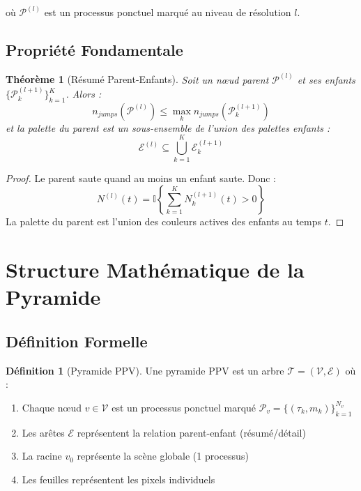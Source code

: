 \documentclass[12pt,a4paper]{article}
\newtheorem{theorem}{Théorème}[section]
\theoremstyle{definition}
\newtheorem{definition}{Définition}[section]
\begin{document}
	où $\mathcal{P}^{(l)}$ est un processus ponctuel marqué au niveau de résolution $l$.
	
	\subsection{Propriété Fondamentale}
	
	\begin{theorem}[Résumé Parent-Enfants]
		\label{thm:resume_parent}
		Soit un nœud parent $\mathcal{P}^{(l)}$ et ses enfants $\{\mathcal{P}^{(l+1)}_k\}_{k=1}^K$. Alors :
		\begin{equation}
			n_{jumps}(\mathcal{P}^{(l)}) \leq \max_k n_{jumps}(\mathcal{P}^{(l+1)}_k)
		\end{equation}
		et la palette du parent est un sous-ensemble de l'union des palettes enfants :
		\begin{equation}
			\mathcal{E}^{(l)} \subseteq \bigcup_{k=1}^K \mathcal{E}^{(l+1)}_k
		\end{equation}
	\end{theorem}
	
	\begin{proof}
		Le parent saute quand au moins un enfant saute. Donc :
		\begin{equation}
			N^{(l)}(t) = \mathbb{I}\left\{\sum_{k=1}^K N^{(l+1)}_k(t) > 0\right\}
		\end{equation}
		La palette du parent est l'union des couleurs actives des enfants au temps $t$.
	\end{proof}
	
	\section{Structure Mathématique de la Pyramide}
	
	\subsection{Définition Formelle}
	
	\begin{definition}[Pyramide PPV]
		\label{def:pyramide_ppv}
		Une pyramide PPV est un arbre $\mathcal{T} = (\mathcal{V}, \mathcal{E})$ où :
		\begin{enumerate}
			\item Chaque nœud $v \in \mathcal{V}$ est un processus ponctuel marqué $\mathcal{P}_v = \{(\tau_k, m_k)\}_{k=1}^{N_v}$
			\item Les arêtes $\mathcal{E}$ représentent la relation parent-enfant (résumé/détail)
			\item La racine $v_0$ représente la scène globale (1 processus)
			\item Les feuilles représentent les pixels individuels
		\end{enumerate}
	\end{definition}
	
\end{document}
